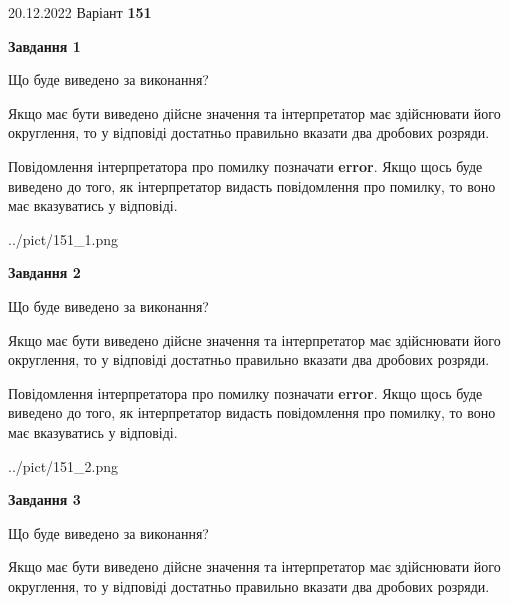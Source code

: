 \documentclass[12pt, ukrainian]{article}
\begin{document}
{20.12.2022 Варіант \No \textbf { 151 }\par}
{
\begin {Large}

{\begin {center}\textbf{Завдання 1}\end {center}}\par
Що буде виведено за виконання? \par

Якщо має бути виведено дійсне значення та інтерпретатор має здійснювати його округлення, 
то у відповіді достатньо правильно вказати два дробових розряди.

Повідомлення інтерпретатора про помилку позначати \textbf{error}.
Якщо щось буде виведено до того, як інтерпретатор видасть повідомлення про помилку, 
то воно має вказуватись у відповіді. \par

\begin{center}
	{../pict/151_1.png}
\end{center}
\newpage

{\begin {center}\textbf{Завдання 2}\end {center}}\par
Що буде виведено за виконання? \par

Якщо має бути виведено дійсне значення та інтерпретатор має здійснювати його округлення, 
то у відповіді достатньо правильно вказати два дробових розряди.

Повідомлення інтерпретатора про помилку позначати \textbf{error}.
Якщо щось буде виведено до того, як інтерпретатор видасть повідомлення про помилку, 
то воно має вказуватись у відповіді. \par

\begin{center}
	{../pict/151_2.png}
\end{center}
\newpage

{\begin {center}\textbf{Завдання 3}\end {center}}\par
Що буде виведено за виконання? \par

Якщо має бути виведено дійсне значення та інтерпретатор має здійснювати його округлення, 
то у відповіді достатньо правильно вказати два дробових розряди.


\end{Large}}
\end{document}
